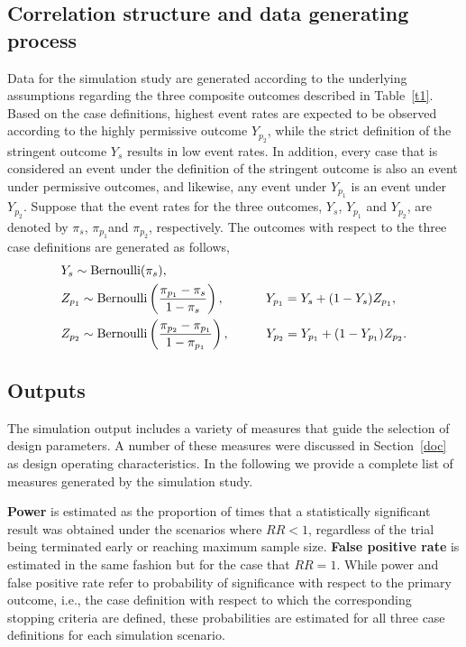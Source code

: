 \documentclass[12pt]{article}
\begin{document}
\subsection{Correlation structure and data generating process
}
Data for the simulation study are generated according to the underlying assumptions regarding the three composite outcomes described in Table~\ref{t1}. Based on the case definitions, highest event rates are expected to be observed according to the highly permissive outcome $Y_{p_2}$, while the strict definition of the stringent outcome $Y_s$ results in low event rates. In addition, every case that is considered an event under the definition of the stringent outcome is also an event under permissive outcomes, and likewise, any event under $Y_{p_1}$ is an event under $Y_{p_2}$. Suppose that the event rates for the three outcomes, $Y_s$, $Y_{p_1}$ and $Y_{p_2}$, are denoted by $\pi_s$, $\pi_{p_1}$and $\pi_{p_2}$, respectively. The outcomes with respect to the three case definitions are generated as follows,
\begin{align}
&Y_s\sim \text{Bernoulli}( \pi_s ),
\nonumber\\
&Z_{p_1}\sim \text{Bernoulli}\left(\frac{\pi_{p_1}- \pi_s}{1-\pi_s}\right), \hskip 33pt Y_{p_1} = Y_s+(1-Y_s)Z_{p_1},  \nonumber
\\
&  Z_{p_2}\sim \text{Bernoulli}\left(\frac{\pi_{p_2}- \pi_{p_1 }}{1-\pi_{p_1 } }\right),\hskip 29ptY_{p_2} = Y_{p_1}+(1-Y_{p_1 })Z_{p_2}.
\end{align}


\subsection{Outputs}

The simulation output includes a variety of measures that guide the selection of design parameters. A number of these measures were discussed in Section~\ref{doc} as design operating characteristics. In the following we provide a complete list of measures generated by the simulation study. 

{\bf Power} is estimated as the proportion of times that a statistically significant result was obtained under the scenarios where $RR<1$, regardless of the trial being terminated early or reaching maximum sample size. {\bf False positive rate} is estimated in the same fashion but for the case that $RR = 1$. While power and false positive rate refer to probability of significance with respect to the primary outcome, i.e., the case definition with respect to which the corresponding stopping criteria are defined, these probabilities are estimated for all three case definitions for each simulation scenario.
\end{document}

